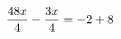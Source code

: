 \documentclass[preview]{standalone}
\begin{document}
\begin{align*}
\special{dvisvgm:raw <g id='unique000'>}\frac{48 x}{4} - \frac{3 x}{4} = -2 + 8\special{dvisvgm:raw </g>}
\end{align*}
\end{document}
